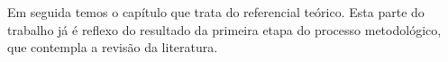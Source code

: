 Em seguida temos o capítulo que trata do referencial teórico. Esta parte do trabalho já é reflexo do resultado da primeira etapa do processo metodológico, que contempla a revisão da literatura.




